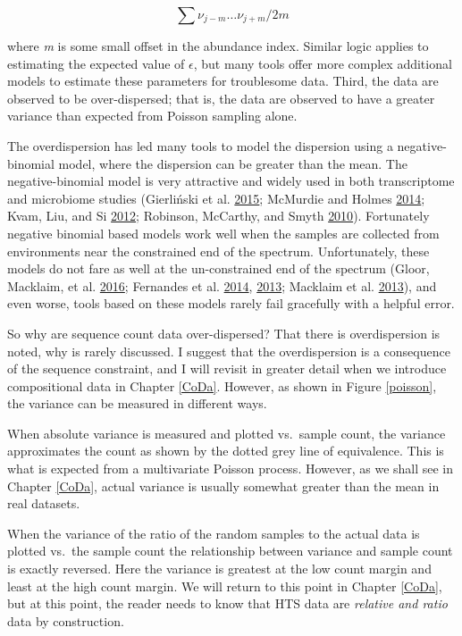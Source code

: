 \documentclass[onecolumn]{book}
\theoremstyle{definition}
\theoremstyle{definition}
\theoremstyle{definition}
\theoremstyle{remark}
\begin{document}
\begin{equation}
\sum \nu_{j-m} \ldots \nu_{j+m} / 2m
\end{equation}

where \textit{m} is some small offset in the abundance index. Similar
logic applies to estimating the expected value of \(\epsilon\), but many
tools offer more complex additional models to estimate these parameters
for troublesome data. Third, the data are observed to be over-dispersed;
that is, the data are observed to have a greater variance than expected
from Poisson sampling alone.

The overdispersion has led many tools to model the dispersion using a
negative-binomial model, where the dispersion can be greater than the
mean. The negative-binomial model is very attractive and widely used in
both transcriptome and microbiome studies (Gierliński et al.
\protect\hyperlink{ref-Gierlinski:2015aa}{2015}; McMurdie and Holmes
\protect\hyperlink{ref-McMurdie:2014a}{2014}; Kvam, Liu, and Si
\protect\hyperlink{ref-Kvam:2012}{2012}; Robinson, McCarthy, and Smyth
\protect\hyperlink{ref-Robinson:2010}{2010}). Fortunately negative
binomial based models work well when the samples are collected from
environments near the constrained end of the spectrum. Unfortunately,
these models do not fare as well at the un-constrained end of the
spectrum (Gloor, Macklaim, et al.
\protect\hyperlink{ref-gloorAJS:2016}{2016}; Fernandes et al.
\protect\hyperlink{ref-fernandes:2014}{2014},
\protect\hyperlink{ref-fernandes:2013}{2013}; Macklaim et al.
\protect\hyperlink{ref-macklaim:2013}{2013}), and even worse, tools
based on these models rarely fail gracefully with a helpful error.

So why are sequence count data over-dispersed? That there is
overdispersion is noted, why is rarely discussed. I suggest that the
overdispersion is a consequence of the sequence constraint, and I will
revisit in greater detail when we introduce compositional data in
Chapter \ref{CoDa}. However, as shown in Figure \ref{poisson}, the
variance can be measured in different ways.

When absolute variance is measured and plotted vs.~sample count, the
variance approximates the count as shown by the dotted grey line of
equivalence. This is what is expected from a multivariate Poisson
process. However, as we shall see in Chapter \ref{CoDa}, actual variance
is usually somewhat greater than the mean in real datasets.

When the variance of the ratio of the random samples to the actual data
is plotted vs.~the sample count the relationship between variance and
sample count is exactly reversed. Here the variance is greatest at the
low count margin and least at the high count margin. We will return to
this point in Chapter \ref{CoDa}, but at this point, the reader needs to
know that HTS data are \emph{relative and ratio} data by construction.
\end{document}
